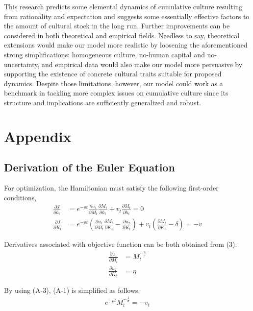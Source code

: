 \documentclass{jsarticle}
\begin{document}
This research predicts some elemental dynamics of cumulative culture resulting from rationality and expectation and suggests some essentially effective factors to the amount of cultural stock in the long run.
Further improvements can be considered in both theoretical and empirical fields.
Needless to say, theoretical extensions would make our model more realistic by loosening the aforementioned strong simplifications: homogeneous culture, no-human capital and no-uncertainty, and empirical data would also make our model more persuasive by supporting the existence of concrete cultural traits suitable for proposed dynamics.
Despite those limitations, however, our model could work as a benchmark in tackling more complex issues on cumulative culture since its structure and implications are sufficiently generalized and robust.

\section*{Appendix}

\hypertarget{appa}{
\subsection*{Derivation of the Euler Equation}
}
For optimization, the Hamiltonian must satisfy the following first-order conditions,
\begin{align} %
    \frac{\partial J}{\partial h_t}  & =
    e^{-\rho t}\frac{\partial u_1}{\partial M_t}\frac{\partial M_t}{\partial h_t} + v_t \frac{\partial M_t}{\partial h_t} = 0 \tag{A-1} \\
    \frac{\partial J}{\partial K_t}  & =
    e^{-\rho t}\left(\frac{\partial u_1}{\partial M_t}\frac{\partial M_t}{\partial K_t} - \frac{\partial u_2}{\partial K_t} \right) + v_t \left(\frac{\partial M_t}{\partial K_t} - \delta\right) = -\dot{v} \tag{A-2}
\end{align}

\noindent Derivatives associated with objective function can be both obtained from (3).
\begin{align}
    \frac{\partial u_1}{\partial M_t} & =  M_{t}^{-\frac{1}{\sigma}} \tag{A-3} \\
    \frac{\partial u_2}{\partial K_t} & =  \eta \tag{A-4}
\end{align}

\noindent By using (A-3), (A-1) is simplified as follows.
\begin{align}
    e^{-\rho t}M_{t}^{-\frac{1}{\sigma}} = -v_t \tag{A-5}
\end{align}
\end{document}
